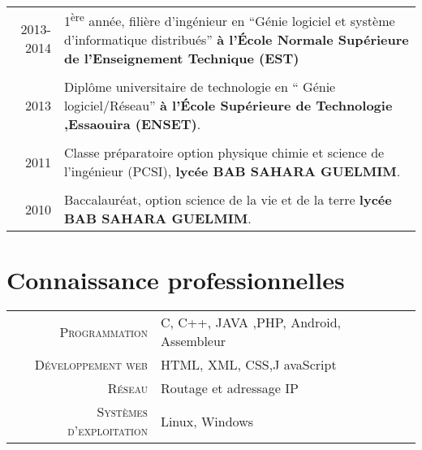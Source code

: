 \documentclass[a4paper,10pt]{article} %
\begin{document}
\begin{tabular}{r|p{11cm}}	
\textsc {2013-2014} & 
1\textsuperscript{ère} année, filière d'ingénieur en ``Génie logiciel et système d'informatique distribués''
\textbf{à l'École Normale Supérieure de l'Enseignement Technique (EST)}\\ \multicolumn{2}{c}{} \\


\textsc{2013} & Diplôme universitaire de technologie en `` Génie logiciel/Réseau'' \textbf{à l'École  Supérieure de Technologie ,Essaouira (ENSET)}.\\ \multicolumn{2}{c}{} \\


\textsc{2011} & Classe préparatoire option physique chimie et science de l'ingénieur (PCSI),
\textbf{lycée BAB SAHARA GUELMIM}.\\ \multicolumn{2}{c}{} \\


\textsc{2010} &  Baccalauréat, option science de la vie et de la terre \textbf{lycée BAB SAHARA GUELMIM}.
\end{tabular}


\section{Connaissance professionnelles}

\begin{tabular}{rl}
\textsc{Programmation} & C, C++, JAVA ,PHP, Android, Assembleur \\

\textsc{Développement web} & HTML, XML, CSS,J avaScript \\

\textsc{Réseau} & Routage et adressage IP \\
\textsc{Systèmes d'exploitation} & Linux, Windows \\ 
\end{tabular}
\end{document}
